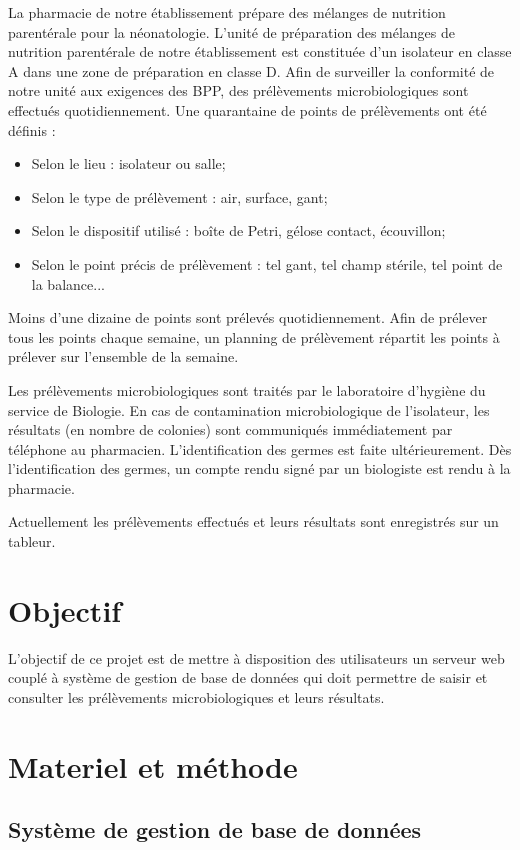 \documentclass[12pt,a4paper,oneside]{article}
\begin{document}
La pharmacie de notre établissement prépare des mélanges de nutrition parentérale pour la néonatologie. L'unité de préparation des mélanges de nutrition parentérale de notre établissement est constituée d'un isolateur en classe A dans une zone de préparation en classe D. Afin de surveiller la conformité de notre unité aux exigences des BPP, des prélèvements microbiologiques sont effectués quotidiennement. Une quarantaine de points de prélèvements ont été définis :
\begin{itemize}
 \item Selon le lieu : isolateur ou salle;
 \item Selon le type de prélèvement : air, surface, gant;
 \item Selon le dispositif utilisé : boîte de Petri, gélose contact, écouvillon;
 \item Selon le point précis de prélèvement : tel gant, tel champ stérile, tel point de la balance...
 \end{itemize}
Moins d'une dizaine de points sont prélevés quotidiennement. Afin de prélever tous les points chaque semaine, un planning de prélèvement répartit les points à prélever sur l'ensemble de la semaine.

Les prélèvements microbiologiques sont traités par le laboratoire d'hygiène du service de Biologie. En cas de contamination microbiologique de l'isolateur, les résultats (en nombre de colonies) sont communiqués immédiatement par téléphone au pharmacien. L'identification des germes est faite ultérieurement. Dès l'identification des germes, un compte rendu signé par un biologiste est rendu à la pharmacie.

Actuellement les prélèvements effectués et leurs résultats sont enregistrés sur un tableur.
\section{Objectif}
L'objectif de ce projet est de mettre à disposition des utilisateurs un serveur web couplé à système de gestion de base de données qui doit permettre de saisir et consulter les prélèvements microbiologiques et leurs résultats.
\section{Materiel et méthode}

\subsection{Système de gestion de base de données}
\end{document}
